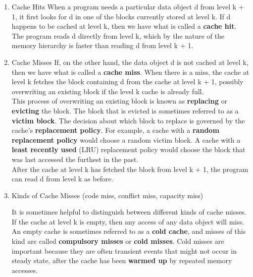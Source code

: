 \documentclass[11pt]{article}
\begin{document}
\begin{enumerate}
\item Cache Hits
\label{sec:orgdd969c7}
When a program needs a particular data object d from level k + 1, it first looks for d in one of the blocks currently stored at level k. If d happens to be cached at level k, then we have what is called a \textbf{cache hit}. The program reads d directly from level k, which by the nature of the memory hierarchy is faster than reading d from level k + 1.\\

\item Cache Misses
\label{sec:org9965f5b}
If, on the other hand, the data object d is not cached at level k, then we have what is called a \textbf{cache miss}. When there is a miss, the cache at level k fetches the block containing d from the cache at level k + 1, possibly overwriting an existing block if the level k cache is already full.\\

This process of overwriting an existing block is known as \textbf{replacing} or \textbf{evicting} the block. The block that is evicted is sometimes referred to as a \textbf{victim block}. The decision about which block to replace is governed by the cache’s \textbf{replacement policy}. For example, a cache with a \textbf{random replacement policy} would choose a random victim block. A cache with a \textbf{least recently used} (LRU) replacement policy would choose the block that was last accessed the furthest in the past.\\

After the cache at level k has fetched the block from level k + 1, the program can read d from level k as before.\\

\item Kinds of Cache Misses (code miss, conflict miss, capacity miss)
\label{sec:orgf13b559}

It is sometimes helpful to distinguish between different kinds of cache misses.\\

If the cache at level k is empty, then any access of any data object will miss. An empty cache is sometimes referred to as a \textbf{cold cache}, and misses of this kind are called \textbf{compulsory misses} or \textbf{cold misses}. Cold misses are important because they are often transient events that might not occur in steady state, after the cache has been \textbf{warmed up} by repeated memory accesses.\\


\end{enumerate}
\end{document}
